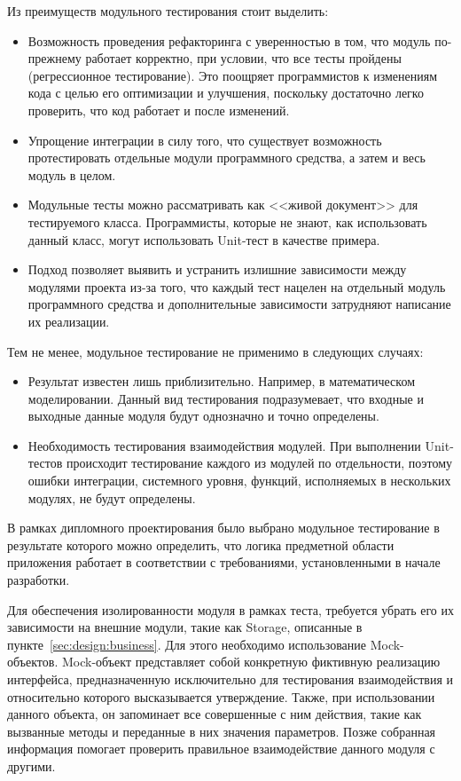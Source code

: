 Из преимуществ модульного тестирования стоит выделить:

\begin{itemize}
    \item Возможность проведения рефакторинга с уверенностью в том, что модуль по-прежнему работает корректно, при условии, что все тесты пройдены (регрессионное тестирование).
    Это поощряет программистов к изменениям кода с целью его оптимизации и улучшения, поскольку достаточно легко проверить, что код работает и после изменений.
    \item Упрощение интеграции в силу того, что существует возможность протестировать отдельные модули программного средства, а затем и весь модуль в целом.
    \item Модульные тесты можно рассматривать как <<живой документ>> для тестируемого класса.
    Программисты, которые не знают, как использовать данный класс, могут использовать Unit-тест в качестве примера.
    \item Подход позволяет выявить и устранить излишние зависимости между модулями проекта из-за того, что каждый тест нацелен на отдельный модуль программного средства и дополнительные зависимости затрудняют написание их реализации.
\end{itemize}

Тем не менее, модульное тестирование не применимо в следующих случаях:

\begin{itemize}
    \item Результат известен лишь приблизительно.
    Например, в математическом моделировании.
    Данный вид тестирования подразумевает, что входные и выходные данные модуля будут однозначно и точно определены.
    \item Необходимость тестирования взаимодействия модулей.
    При выполнении Unit-тестов происходит тестирование каждого из модулей по отдельности, поэтому ошибки интеграции, системного уровня, функций, исполняемых в нескольких модулях, не будут определены.
\end{itemize}

В рамках дипломного проектирования было выбрано модульное тестирование в результате которого можно определить, что логика предметной области приложения работает в соответствии с требованиями, установленными в начале разработки.

Для обеспечения изолированности модуля в рамках теста, требуется убрать его их зависимости на внешние модули, такие как Storage, описанные в пункте~\ref{sec:design:business}.
Для этого необходимо использование Mock-объектов.
Mock-объект представляет собой конкретную фиктивную реализацию интерфейса, предназначенную исключительно для тестирования взаимодействия и относительно которого высказывается утверждение.
Также, при использовании данного объекта, он запоминает все совершенные с ним действия, такие как вызванные методы и переданные в них значения параметров.
Позже собранная информация помогает проверить правильное взаимодействие данного модуля с другими.

